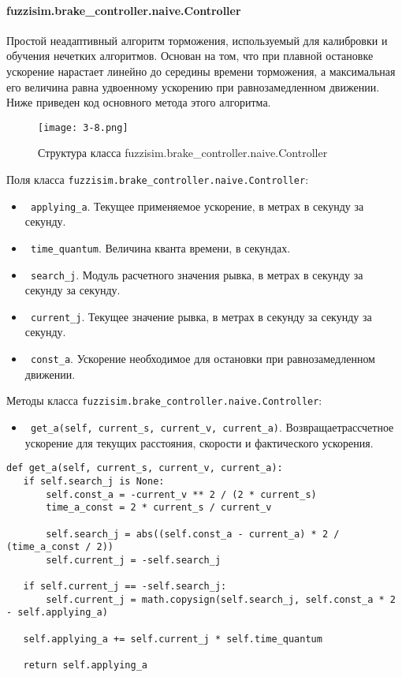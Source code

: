 \paragraph{fuzzisim.brake\_controller.naive.Controller}

Простой неадаптивный алгоритм торможения, используемый для калибровки и обучения нечетких алгоритмов. Основан на том, что при плавной остановке ускорение нарастает линейно до середины времени торможения, а максимальная его величина равна удвоенному ускорению при равнозамедленном движении. Ниже приведен код основного метода этого алгоритма.


\begin{figure}[ht]
	\centering
	\texttt{[image: 3-8.png]}
	\caption{ Структура класса fuzzisim.brake\_controller.naive.Controller}
\end{figure}

Поля класса \lstinline!fuzzisim.brake_controller.naive.Controller!:
\begin{itemize}
	\item \lstinline! applying_a!. Текущее применяемое ускорение, в метрах в секунду за секунду.
	\item \lstinline! time_quantum!. Величина кванта времени, в секундах.
	\item \lstinline! search_j!. Модуль расчетного значения рывка, в метрах в секунду за секунду за секунду.
	\item \lstinline! current_j!. Текущее значение рывка, в метрах в секунду за секунду за секунду.
	\item \lstinline! const_a!. Ускорение необходимое для остановки при равнозамедленном движении.
\end{itemize}


Методы класса \lstinline!fuzzisim.brake_controller.naive.Controller!:
\begin{itemize}
	\item \lstinline! get_a(self, current_s, current_v, current_a)!. Возвращаетрассчетное ускорение для текущих расстояния, скорости и фактического ускорения.
\end{itemize}

\begin{lstlisting}[style=pythonstyle,caption={  }, label=lst:func:1]
def get_a(self, current_s, current_v, current_a):
   if self.search_j is None:
       self.const_a = -current_v ** 2 / (2 * current_s)
       time_a_const = 2 * current_s / current_v

       self.search_j = abs((self.const_a - current_a) * 2 / (time_a_const / 2))
       self.current_j = -self.search_j

   if self.current_j == -self.search_j:
       self.current_j = math.copysign(self.search_j, self.const_a * 2 - self.applying_a)

   self.applying_a += self.current_j * self.time_quantum

   return self.applying_a
\end{lstlisting}



